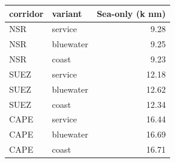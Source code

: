 \begin{tabular}{llr}
\toprule
corridor &   variant &  Sea-only (k nm) \\
\midrule
     NSR &   service &             9.28 \\
     NSR & bluewater &             9.25 \\
     NSR &     coast &             9.23 \\
    SUEZ &   service &            12.18 \\
    SUEZ & bluewater &            12.62 \\
    SUEZ &     coast &            12.34 \\
    CAPE &   service &            16.44 \\
    CAPE & bluewater &            16.69 \\
    CAPE &     coast &            16.71 \\
\bottomrule
\end{tabular}
